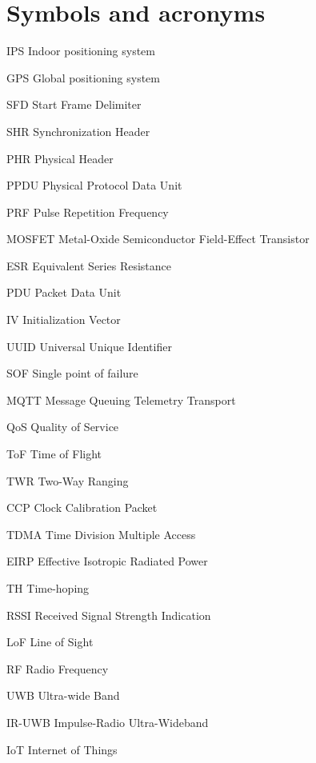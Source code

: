 \documentclass[\main/main.tex]{subfiles}
\begin{document}
\chapter*{Symbols and acronyms}
\begin{abbrv}
    \item[IPS]  Indoor positioning system
    \item[GPS]  Global positioning system 
    \item[SFD]  Start Frame Delimiter
    \item[SHR]  Synchronization Header
    \item[PHR]  Physical Header
    \item[PPDU] Physical Protocol Data Unit
    \item[PRF]  Pulse Repetition Frequency
    \item[MOSFET]  Metal-Oxide Semiconductor Field-Effect Transistor
    \item[ESR]  Equivalent Series Resistance
    \item[PDU] Packet Data Unit
    \item[IV] Initialization Vector
    \item[UUID] Universal Unique Identifier 
    \item[SOF] Single point of failure  
    \item[MQTT] Message Queuing Telemetry Transport 
    \item[QoS] Quality of Service
    \item[ToF] Time of Flight
    \item[TWR] Two-Way Ranging
    \item[CCP] Clock Calibration Packet  
    \item[TDMA] Time Division Multiple Access 
    \item[EIRP] Effective Isotropic Radiated Power
    \item[TH] Time-hoping 
    \item[RSSI] Received Signal Strength Indication
    \item[LoF] Line of Sight
    \item[RF] Radio Frequency 
    \item[UWB] Ultra-wide Band 
    \item[IR-UWB] Impulse-Radio Ultra-Wideband 
    \item[IoT] Internet of Things
\end{abbrv}
\end{document}
